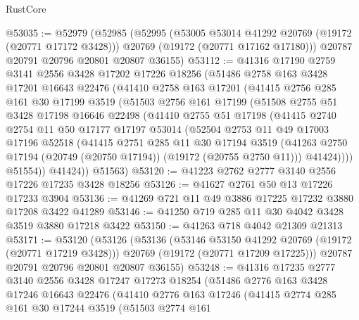 \begin{lexlean}{RustCore}
\begin{coremodule}
@53035 := @52979
    (@52985
      (@52995
        (@53005 @53014 @41292 @20769 (@19172 (@20771 @17172 @3428)))
        @20769
        (@19172 (@20771 @17162 @17180)))
      @20787
      @20791
      @20796
      @20801
      @20807
      @36155)
@53112 := @41316
    @17190
    @2759
    @3141
    @2556
    @3428
    @17202
    @17226
    @18256
    (@51486
      @2758
      @163
      @3428
      @17201
      @16643
      @22476
      (@41410
        @2758
        @163
        @17201
        (@41415
          @2756
          @285
          @161
          @30
          @17199
          @3519
          (@51503
            @2756
            @161
            @17199
            (@51508
              @2755
              @51
              @3428
              @17198
              @16646
              @22498
              (@41410
                @2755
                @51
                @17198
                (@41415
                  @2740
                  @2754
                  @11
                  @50
                  @17177
                  @17197
                  @53014
                  (@52504
                    @2753
                    @11
                    @49
                    @17003
                    @17196
                    @52518
                    (@41415
                      @2751
                      @285
                      @11
                      @30
                      @17194
                      @3519
                      (@41263 @2750 @17194 (@20749 (@20750 @17194)) (@19172 (@20755 @2750 @11)))
                      @41424))))
              @51554))
          @41424))
      @51563)
@53120 := @41223 @2762 @2777 @3140 @2556 @17226 @17235 @3428 @18256
@53126 := @41627 @2761 @50 @13 @17226 @17233 @3904
@53136 := @41269 @721 @11 @49 @3886 @17225 @17232 @3880 @17208 @3422 @41289
@53146 := @41250 @719 @285 @11 @30 @4042 @3428 @3519 @3880 @17218 @3422
@53150 := @41263 @718 @4042 @21309 @21313
@53171 := @53120
    (@53126
      (@53136
        (@53146 @53150 @41292 @20769 (@19172 (@20771 @17219 @3428)))
        @20769
        (@19172 (@20771 @17209 @17225)))
      @20787
      @20791
      @20796
      @20801
      @20807
      @36155)
@53248 := @41316
    @17235
    @2777
    @3140
    @2556
    @3428
    @17247
    @17273
    @18254
    (@51486
      @2776
      @163
      @3428
      @17246
      @16643
      @22476
      (@41410
        @2776
        @163
        @17246
        (@41415
          @2774
          @285
          @161
          @30
          @17244
          @3519
          (@51503
            @2774
            @161

\end{coremodule}
\end{lexlean}
